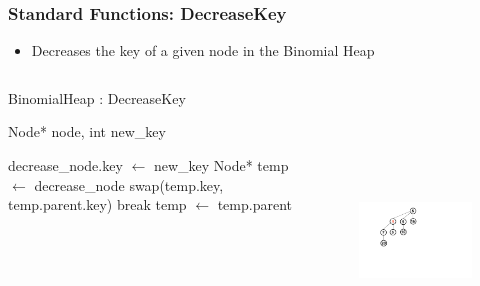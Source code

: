 \documentclass[13pt]{beamer}
\begin{document}
\begin{frame}
\frametitle{Standard Functions: DecreaseKey}
  \begin{itemize}
    \item Decreases the key of a given node in the Binomial Heap
  \end{itemize}

  \begin{columns}[T] %
    \begin{column}[T]{6cm} %
        \begin{algorithm}[H]
        \small
        \caption{BinomialHeap : DecreaseKey}
        \begin{algorithmic}
          \REQUIRE Node* node, int new\_key

          \STATE decrease\_node.key $\leftarrow$ new\_key
          \STATE Node* temp $\leftarrow$ decrease\_node
                \STATE swap(temp.key, temp.parent.key)
              \ELSE
                \STATE break
              \ENDIF
              \STATE temp $\leftarrow$ temp.parent
          \ENDWHILE
        \end{algorithmic}
        \end{algorithm}
    \end{column}
    \begin{column}[T]{7.5cm} %
      \begin{figure}
        \includegraphics[height=8cm]{./img/decreasekeyC.png}
      \end{figure}
    \end{column}
  \end{columns}

\end{frame}
\end{document}
